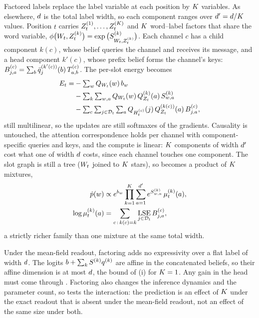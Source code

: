 Factored labels replace the label variable at each position by $K$ variables. As
elsewhere, $d$ is the total label width, so each component ranges over
$d' = d/K$ values. Position $t$ carries $Z_{t}^{(1)},\dots,Z_{t}^{(K)}$ and
$K$ word--label factors that share the word variable,
$\phi\big(W_{t},Z_{t}^{(k)}\big) = \exp\big(S^{(k)}_{W_{t},Z_{t}^{(k)}}\big)$. Each
channel $c$ has a child component $k(c)$, whose belief queries the channel and receives its
message, and a head component $k'(c)$, whose prefix belief forms the channel's keys:
$B^{(c)}_{j,a} = \sum_b \bar{q}_{j}^{(k'(c))}(b)\,T^{(c)}_{a,b}$. The per-slot energy becomes
%
\begin{equation}
\label{eq:factored-energy}
\begin{aligned}
  E_t = &-\textstyle\sum_w Q_{W_{t}}(w)\,b_w \\
        &-\textstyle\sum_k \sum_{w,a} Q_{W_{t}}(w)\,Q_{Z_{t}}^{(k)}(a)\,S^{(k)}_{w,a}\\
        &-\textstyle\sum_c \sum_{j\in\mathcal{D}_{t}} \sum_a Q_{H_{t}^{(c)}}(j)\,Q_{Z_{t}}^{(k(c))}(a)\,
           B^{(c)}_{j,a},
\end{aligned}
\end{equation}
%
still multilinear, so the updates are still softmaxes of the gradients. Causality is untouched,
the attention correspondence holds per channel with component-specific queries and keys, and the
compute is linear: $K$ components of width $d'$ cost what one of width $d$ costs,
since each channel touches one component. The slot
graph is still a tree ($W_{t}$ joined to $K$ stars), so  becomes a
product of $K$ mixtures,
%
\begin{equation}
\label{eq:factored-readout}
\begin{aligned}
  \hat p(w) &\propto e^{b_w}\prod_{k=1}^{K}
     \sum_{a=1}^{d'} e^{S^{(k)}_{w,a}}\,\mu_{t}^{(k)}(a),\\
  \log \mu_{t}^{(k)}(a) &= \sum_{c\,:\,k(c)=k} \operatorname*{LSE}_{j\in\mathcal{D}_{t}} B^{(c)}_{j,a},
\end{aligned}
\end{equation}
%
a strictly richer family than one mixture at the same total width.

Under the mean-field readout, factoring adds no expressivity over a flat label of width
$d$. The
logits $b + \sum_k S^{(k)}q^{(k)}$ are affine in the concatenated beliefs, so their
affine dimension is at most $d$, the bound of (i) for $K=1$. Any gain
in the head must come through . Factoring also changes the inference
dynamics and the parameter count, so  tests the interaction: the
prediction is an effect of $K$ under the exact readout that is absent under the mean-field
readout, not an effect of the same size under both.

